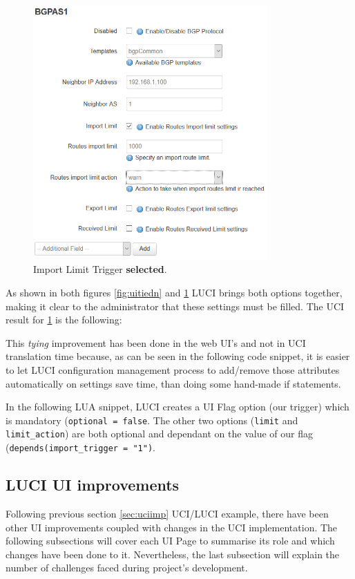\begin{itemize}
\begin{figure}[H]
    \centering
    \includegraphics[width=0.8\textwidth]{images/bgp/bgptrigger2}
    \caption{Import Limit Trigger \textbf{selected}.}
    \label{fig:uitiedy}
\end{figure}

As shown in both figures \ref{fig:uitiedn} and \ref{fig:uitiedy} LUCI brings both options together, making it clear to the administrator that these settings must be filled. The UCI result for \ref{fig:uitiedy} is the following:



This \textit{tying} improvement has been done in the web UI's and not in UCI translation time because, as can be seen in the following code snippet, it is easier to let LUCI configuration management process to add/remove those attributes automatically on settings save time, than doing some hand-made if statements.

In the following LUA snippet, LUCI creates a UI Flag option (our trigger) which is mandatory (\texttt{optional = false}. The other two options (\texttt{limit} and \texttt{limit\_action}) are both optional and dependant on the value of our flag (\texttt{depends({import\_trigger = "1"})}.


\end{itemize}

\newpage

\subsection{LUCI UI improvements}
\label{sec:luciimp}
Following previous section \ref{sec:uciimp} UCI/LUCI example, there have been other UI improvements coupled with changes in the UCI implementation. The following subsections will cover each UI Page to summarise its role and which changes have been done to it. Nevertheless, the last subsection will explain the number of challenges faced during project's development.

